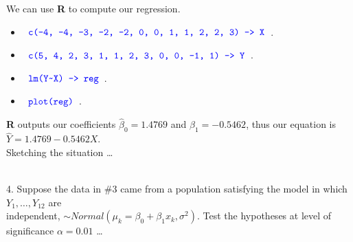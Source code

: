 \documentclass[12pt]{article}
\newcommand{\XB}{\color{black}}
\newcommand{\XBB}{\color{blue}}
\newcommand{\ds}{\displaystyle}
\begin{document}
\noindent
We can use \textbf{R} to compute our regression. 

\begin{itemize}
    \item $ \ds {\XBB \texttt{ c(-4, -4, -3, -2, -2, 0, 0, 1, 1, 2, 2, 3) -> X }} $.
    \item $ \ds {\XBB \texttt{ c(5, 4, 2, 3, 1, 1, 2, 3, 0, 0, -1, 1) -> Y }} $.
    \item $ \ds {\XBB \texttt{ lm(Y} \verb|~| \texttt{X) -> reg }} $.
    \item $ \ds {\XBB \texttt{ plot(reg) }} $.
\end{itemize}

\noindent
\textbf{R} outputs our coefficients $ \hat{\beta}_{0} = 1.4769 $ and $ \hat{\beta}_{1} = -0.5462 $, thus our equation is $ \hat{Y} = 1.4769 - 0.5462X $. \\

\noindent
Sketching the situation \dots \\

\begin{center}
\end{center}

\vspace{2.5mm}

\newpage
\XBB\hrulefill\XB \\

4. Suppose the data in \#3 came from a population satisfying the model in which $ Y_{1}, \dots , Y_{12} $ are \\ independent, 
$ \sim Normal(\mu_{k} = \beta_{0} + \beta_{1}x_{k}, \sigma^{2}) $. Test the hypotheses at level of significance $ \alpha = 0.01 $ \dots \\
\end{document}
